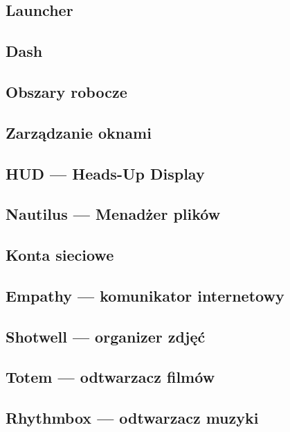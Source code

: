 \documentclass[a4paper,11pt,oneside]{mwart}
\begin{document}
		\subsection{Launcher}
			
		\subsection{Dash}
			
		\subsection{Obszary robocze}
			
		\subsection{Zarządzanie oknami}
			
		\subsection{HUD --- Heads-Up Display}
			
		\subsection{Nautilus --- Menadżer plików}
			
		\subsection{Konta sieciowe}
			
		\subsection{Empathy --- komunikator internetowy}
			
		\subsection{Shotwell --- organizer zdjęć}
			
		\subsection{Totem --- odtwarzacz filmów}
			
		\subsection{Rhythmbox --- odtwarzacz muzyki}
			
\end{document}
